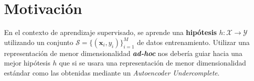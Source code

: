 \section*{Motivación}

En el contexto de aprendizaje supervisado, se aprende una \textbf{hipótesis} $h\colon \mathcal{X} \rightarrow \mathcal{Y}$ utilizando un conjunto $\mathcal{S} = \{(\bm{x}_i, y_i)\}_{i=1}^M$ de datos entrenamiento. Utilizar una representación de menor dimensionalidad \textbf{\textit{ad-hoc}} nos debería guiar hacia una mejor hipótesis $h$ que si se usara una representación de menor dimensionalidad estándar como las obtenidas mediante un \textit{Autoencoder Undercomplete}.
